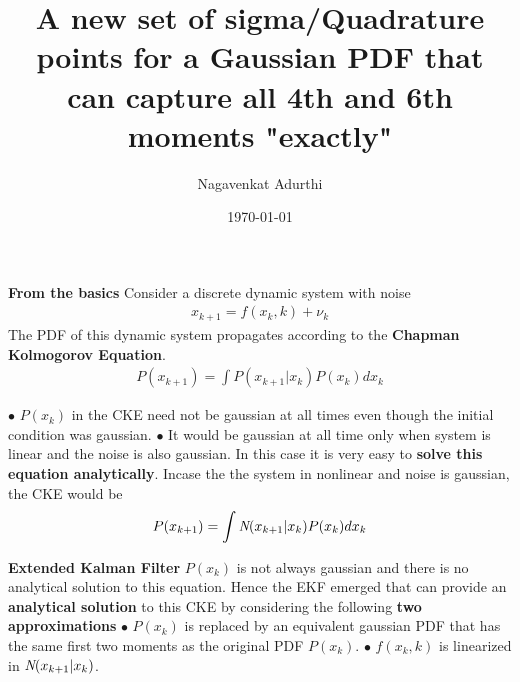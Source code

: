 \documentclass[landscape]{slides}
\title{A new set of sigma/Quadrature points for a Gaussian PDF that can capture all 4th and 6th moments "exactly"}
\author{Nagavenkat Adurthi}
\date{\today}
\begin{document}
\maketitle
\normalsize

\begin{slide}
{\bf From the basics}\newline\newline
Consider a discrete dynamic system with noise
\begin{align*}
x_{k+1}=f(x_k,k)+\nu_k
\end{align*}
	The PDF of this dynamic system propagates according to the {\bf Chapman Kolmogorov Equation}.
	\begin{align*}
	P(x_{k+1})=\int{P(x_{k+1}|x_k)P(x_k)}dx_k
	\end{align*}
	\end{slide}
\begin{slide}
	$\bullet$ $P(x_k)$ in the CKE need not be gaussian at all times even though the initial condition was gaussian. \newline\newline
	$\bullet$ It would be gaussian at all time only when system is linear and the noise is also gaussian. In this case it is very easy to {\bf solve this equation analytically}.\newline \newline
	Incase the  the system in nonlinear and noise is gaussian, the CKE would be
	\begin{align*}
	P(x_{k+1})=\int{{\bf\emph{N}}(x_{k+1}|x_k)P(x_k)}dx_k
	\end{align*}\newline
	\end{slide}
\begin{slide}
	{\bf Extended Kalman Filter}\newline\newline
	$P(x_k)$ is not always gaussian and there is no analytical solution to this equation. Hence the EKF emerged that can provide an {\bf analytical solution} to this CKE by considering the following {\bf two approximations}\newline\newline
	$\bullet$ $P(x_k)$ is replaced by an equivalent gaussian PDF that has the same first two moments as the original PDF $P(x_k)$.\newline\newline
	$\bullet$ $f(x_k,k)$ is linearized in ${\bf\emph{N}}(x_{k+1}|x_k)$.
	\end{slide}
\end{document}
